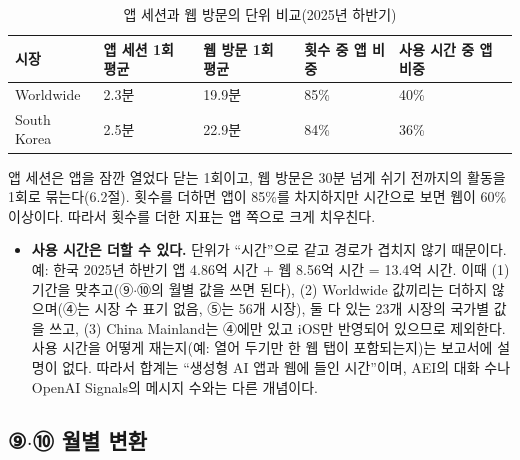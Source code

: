 \documentclass[11pt]{article}
\begin{document}
\begin{longtable}{L{2.6cm}L{2.8cm}L{2.8cm}L{2.8cm}L{3.2cm}}
\caption{앱 세션과 웹 방문의 단위 비교(2025년 하반기)}\label{tab:appweb}\\
\toprule
시장 & 앱 세션 1회 평균 & 웹 방문 1회 평균 & 횟수 중 앱 비중 & 사용 시간 중 앱 비중 \\
\midrule
\endhead
Worldwide & 2.3분 & 19.9분 & 85\% & 40\% \\
South Korea & 2.5분 & 22.9분 & 84\% & 36\% \\
\bottomrule
\end{longtable}

앱 세션은 앱을 잠깐 열었다 닫는 1회이고, 웹 방문은 30분 넘게 쉬기 전까지의 활동을 1회로 묶는다(6.2절). 횟수를 더하면 앱이 85\%를 차지하지만 시간으로 보면 웹이 60\% 이상이다. 따라서 횟수를 더한 지표는 앱 쪽으로 크게 치우친다.

\begin{itemize}
  \item \textbf{사용 시간은 더할 수 있다.} 단위가 ``시간''으로 같고 경로가 겹치지 않기 때문이다. 예: 한국 2025년 하반기 앱 4.86억 시간 + 웹 8.56억 시간 = 13.4억 시간. 이때 (1) 기간을 맞추고(⑨$\cdot$⑩의 월별 값을 쓰면 된다), (2) Worldwide 값끼리는 더하지 않으며(④는 시장 수 표기 없음, ⑤는 56개 시장), 둘 다 있는 23개 시장의 국가별 값을 쓰고, (3) China Mainland는 ④에만 있고 iOS만 반영되어 있으므로 제외한다. 사용 시간을 어떻게 재는지(예: 열어 두기만 한 웹 탭이 포함되는지)는 보고서에 설명이 없다. 따라서 합계는 ``생성형 AI 앱과 웹에 들인 시간''이며, AEI의 대화 수나 OpenAI Signals의 메시지 수와는 다른 개념이다.
\end{itemize}

\subsection{⑨$\cdot$⑩ 월별 변환}
\end{document}
